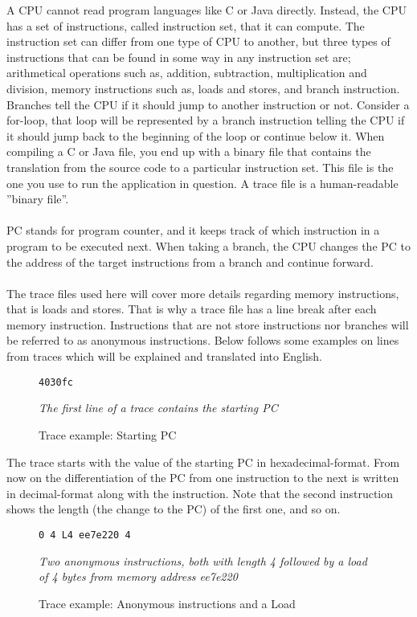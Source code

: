 A CPU cannot read program languages like C or Java directly. Instead, the CPU
has a set of instructions, called instruction set, that it can compute. The instruction
set can differ from one type of CPU to another, but three types of instructions that
can be found in some way in any instruction set are; arithmetical operations such
as, addition, subtraction, multiplication and division, memory instructions such as,
loads and stores, and branch instruction. Branches tell the CPU if it should jump to another
instruction or not. Consider a for-loop, that loop will be represented by a branch
instruction telling the CPU if it should jump back to the beginning of the loop or
continue below it. When compiling a C or Java file, you end up with a binary file
that contains the translation from the source code to a particular instruction set. This file
is the one you use to run the application in question. A trace file is a human-readable
”binary file”.
\\\\
PC stands for program counter, and it keeps track of which instruction in a program
to be executed next. When taking a branch, the CPU changes the PC to the address of the target instructions from a branch and continue forward.
\\\\
The trace files used here will cover more details regarding memory instructions,
that is loads and stores. That is why a trace file has a line break after each memory
instruction. Instructions that are not store instructions nor branches will be referred to as anonymous instructions. Below follows some examples on lines from traces which will be
explained and translated into English.
\begin{figure}[h]
\begin{lstlisting}[frame=single]  
4030fc
\end{lstlisting}
\centering
 \emph{The first line of a trace contains the starting PC}
  \caption{Trace example: Starting PC}
\end{figure}

The trace starts with the value of the starting PC in hexadecimal-format. From now on the differentiation of the PC from one instruction to the next is written in decimal-format along with the instruction. Note that the second instruction shows the length
(the change to the PC) of the first one, and so on.

\begin{figure}[h]
\begin{lstlisting}[frame=single]  
0 4 L4 ee7e220 4
\end{lstlisting}
\centering
\emph{Two anonymous instructions, both with length 4 followed by a load of 4
bytes from memory address ee7e220}
  \caption{Trace example: Anonymous instructions and a Load}
\end{figure}

